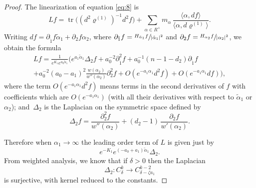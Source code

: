 \documentclass[10pt]{amsart}
\theoremstyle{plain}
\theoremstyle{definition}
\DeclareMathOperator{\tr}{tr}
\newcommand{\ta}{\tilde \alpha}
\newcommand{\rRoots}{R}
\newcommand{\rhoun}{\varrho^{(1)}}
\begin{document}
\begin{proof}
The linearization of equation \eqref{eq:8} is
\begin{equation}
Lf = \tr\big( (d^2\rhoun)^{-1}d^2f \big) + \sum_{\alpha\in \rRoots^+}m_\alpha\, \frac{\langle\alpha,df\rangle}{\langle\alpha,d\rhoun\rangle}.
\end{equation}
Writing $df=\partial_{\tilde 1}f \ta_1 + \partial_2f \alpha_2$, where $\partial_{\tilde 1}f=\sfrac{H_{\ta_1}f }{|\ta_1|^2}$ and $\partial_2f=\sfrac{H_{\alpha_2}f}{|\alpha_2|^2}$,
we obtain the formula
\begin{multline}
\label{eq:10}
Lf = \frac1{e^{K_1}e^{a_0\ta_1}} \Big( e^{a_1\ta_1} \Delta_2f +
a_0^{-2} \partial_{\tilde 1}^2f + a_0^{-1} (n-1-d_2) \partial_{\tilde 1}f \\ +
a_0^{-2}(a_0-a_1)^2\frac{w(\alpha_2)}{w''(\alpha_2)}\partial_2^2f
+ O(e^{-a_1\alpha_1}d^2f) + O(e^{-a_1\alpha_1}df) \Big),
\end{multline}
where the term $O(e^{-a_1\alpha_1}d^2f)$ means terms in the second derivatives of $f$ with coefficients which are $O(e^{-a_1\alpha_1})$ (with all their derivatives with respect to $\ta_1$ or $\alpha_2$); and~$\Delta_2$ is the Laplacian on the symmetric space defined by
\begin{equation}
\Delta_2f = \frac{\partial_2^2f}{w''(\alpha_2)} + (d_2-1)\, \frac{\partial_2f}{w'(\alpha_2)}.
\end{equation}

Therefore when $\alpha_1\to\infty$ the leading order term of $L$ is given just by
\[ e^{-K_1}e^{(-a_0+a_1)\ta_1}\Delta_2. \]
From weighted analysis, we know that if $\delta>0$ then the Laplacian
\[ \Delta_2 : C^k_\delta \longrightarrow C^{k-2}_{\delta-\zeta a_1} \]
is surjective, with kernel reduced to the constants.


\end{proof}
\end{document}
